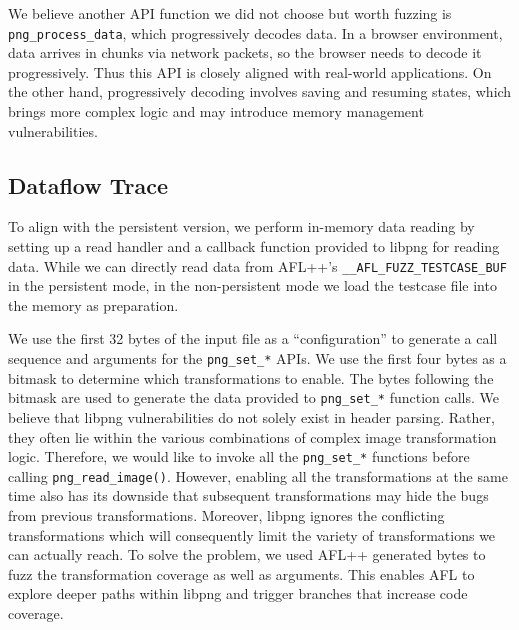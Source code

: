 \documentclass[letterpaper,twocolumn,10pt]{article}
\begin{document}
We believe another API function we did not choose but worth fuzzing is \lstinline|png_process_data|, which progressively decodes data. In a browser environment, data arrives in chunks via network packets, so the browser needs to decode it progressively. Thus this API is closely aligned with real-world applications. On the other hand, progressively decoding involves saving and resuming states, which brings more complex logic and may introduce memory management vulnerabilities.

\subsection{Dataflow Trace}

To align with the persistent version, we perform in-memory data reading by setting up a read handler and a callback function provided to libpng for reading data.
While we can directly read data from AFL++'s \lstinline|__AFL_FUZZ_TESTCASE_BUF| in the persistent mode, in the non-persistent mode we load the testcase file into the memory as preparation.

We use the first 32 bytes of the input file as a ``configuration'' to generate a call sequence and arguments for the \lstinline|png_set_*| APIs. We use the first four bytes as a bitmask to determine which transformations to enable. The bytes following the bitmask are used to generate the data provided to \lstinline|png_set_*| function calls.
We believe that libpng vulnerabilities do not solely exist in header parsing. Rather, they often lie within the various combinations of complex image transformation logic. Therefore, we would like to invoke all the \lstinline{png_set_*} functions before calling \lstinline{png_read_image()}. However, enabling all the transformations at the same time also has its downside that subsequent transformations may hide the bugs from previous transformations. Moreover, libpng ignores the conflicting transformations which will consequently limit the variety of transformations we can actually reach. To solve the problem, we used AFL++ generated bytes to fuzz the transformation coverage as well as arguments. This enables AFL to explore deeper paths within libpng and trigger branches that increase code coverage.
\end{document}
